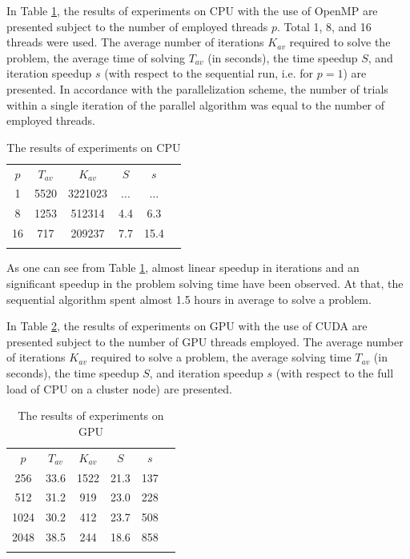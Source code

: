 \documentclass{llncs}
\begin{document}
In Table \ref{tab:2}, the results of experiments on CPU with the use of OpenMP are presented 
subject to the number of employed threads $p$. Total 1, 8, and 16 threads were used. The 
average number of iterations $K_{av}$ required to solve the problem, the average time of 
solving $T_{av}$ (in seconds), the time speedup $S$, and iteration speedup $s$ (with respect 
to the sequential run, i.e. for $p=1$) are presented. In accordance with the parallelization 
scheme, the number of trials within a single iteration of the parallel algorithm was equal to the 
number of employed threads.

\begin{table}
	\caption{The results of experiments on CPU}
	\label{tab:2}
	\center
	\begin{tabular}{cccccc}
		\hline\noalign{\smallskip}        
		$p$ & $T_{av}$ & $K_{av}$ & $S$ & $s$ \\
	\noalign{\smallskip} \hline \noalign{\smallskip}
	1 \;&	5520 \;  & 3221023 \;  & ...\; & ...  \\
	8 \;&	1253 \; & 512314 \;  & 4.4\; & 6.3  \\
	16\;&  717 \; &  209237 \; & 7.7\; & 15.4 \\
		\noalign{\smallskip}\hline
	\end{tabular}
\end{table}

As one can see from Table \ref{tab:2}, almost linear speedup in iterations and an significant 
speedup in the problem solving time have been observed. At that, the sequential algorithm spent 
almost 1.5 hours in average to solve a problem.

In Table \ref{tab:3}, the results of experiments on GPU with the use of CUDA are presented 
subject to the number of GPU threads employed. The average number of iterations $K_{av}$ 
required to solve a problem, the average solving time $T_{av}$ (in seconds), the time speedup 
$S$, and iteration speedup $s$ (with respect to the full load of CPU on a cluster node) are 
presented. 

\begin{table}
	\caption{The results of experiments on GPU}
	\label{tab:3}
	\center
	\begin{tabular}{cccccc}
		\hline\noalign{\smallskip}
			$p$ & $T_{av}$ & $K_{av}$ & $S$ & $s$ \\
	\noalign{\smallskip} \hline \noalign{\smallskip}
	256 \;&	33.6 \; & 1522\;  & 21.3 \; & 137  \\
	512 \;&	31.2 \; & 919 \;  & 23.0 \; & 228  \\
	1024\;& 30.2 \; & 412 \; & 23.7  \; & 508  \\
	2048\;& 38.5 \; & 244 \; & 18.6  \; & 858  \\
		\noalign{\smallskip}\hline
	\end{tabular}
\end{table}
\end{document}
